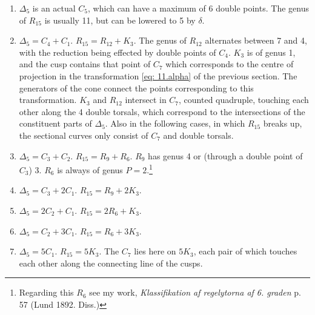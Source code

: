 \documentclass[leqno]{article}
\begin{document}
\begin{enumerate}[label=\arabic*)]
	\item $\Delta_5$ is an actual $C_5$, which can have a maximum of 6 double points. The genus of $R_{15}$ is usually 11, but can be lowered to 5 by $\delta$.
	\item $\Delta_5 = C_4 + C_1$. $R_{15} = R_{12} + K_3$. The genus of $R_{12}$ alternates between 7 and 4, with the reduction being effected by double points of $C_4$. $K_3$ is of genus 1, and the cusp contains that point of $C_7$ which corresponds to the centre of projection in the transformation \eqref{eq: 11.alpha} of the previous section. The generators of the cone connect the points corresponding to this transformation. $K_3$ and $R_{12}$ intersect in $C_7$, counted quadruple, touching each other along the 4 double torsals, which correspond to the intersections of the constituent parts of $\Delta_5$. Also in the following cases, in which $R_{15}$ breaks up, the sectional curves only consist of $C_7$ and double torsals.
	\item $\Delta_5 = C_3 + C_2$. $R_{15} = R_9 + R_6$. $R_9$ has genus 4 or (through a double point of $C_3$) 3. $R_6$ is always of genus $P=2$.\footnote{Regarding this $R_6$ see my work, \textit{Klassifikation af regelytorna af 6. graden} p. 57 (Lund 1892. Diss.)} 
	\item $\Delta_5 = C_3 + 2 C_1$. $R_{15} = R_9 + 2 K_3$. 
	\item $\Delta_5 = 2 C_2 + C_1$. $R_{15} = 2 R_6 + K_3$.
	\item $\Delta_5 = C_2 + 3 C_1$. $R_{15} = R_6 + 3 K_3$.
	\item $\Delta_5 = 5 C_1$. $R_{15} = 5 K_3$. The $C_7$ lies here on $5K_3$, each pair of which touches each other along the connecting line of the cusps.
\end{enumerate}
\end{document}
